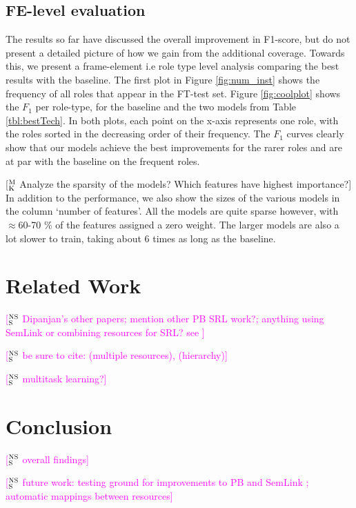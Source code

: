 \documentclass[11pt,a4paper]{article}
\newcommand{\ensuretext}[1]{#1}
\newcommand{\nssmarker}{\ensuretext{\textcolor{magenta}{\ensuremath{^{\textsc{NS}}_{\textsc{S}}}}}}
\newcommand{\mkmarker}{\ensuretext{\textcolor{mdgreen}{\ensuremath{^{\textsc{M}}_{\textsc{K}}}}}}
\newcommand{\arkcomment}[3]{\ensuretext{\textcolor{#3}{[#1 #2]}}}
\newcommand{\nss}[1]{\arkcomment{\nssmarker}{#1}{magenta}}
\newcommand{\mk}[1]{\arkcomment{\mkmarker}{#1}{mdgreen}}
\newcommand{\finalversion}[1]{}
\begin{document}
\subsection{FE-level evaluation}
The results so far have discussed the overall improvement in F1-score, but do not present a detailed picture of how we gain from the additional
coverage. Towards this, we present a frame-element i.e role type level analysis comparing the best results with the baseline.
The first plot in Figure \ref{fig:num_inst} shows the frequency of all roles that appear in the FT-test set.
Figure \ref{fig:coolplot} shows the $F_1$ per role-type, for the baseline and the two models from Table \ref{tbl:bestTech}.
In both plots, each point on the x-axis represents one role, with the roles sorted in the decreasing order of their frequency.
The $F_1$ curves clearly show that our models achieve the best improvements for the rarer roles and are at par with the baseline on the frequent roles.

\mk{Analyze the sparsity of the models? Which features have highest importance?}
In addition to the performance, we also show the sizes of the various models in the column `number of features'. All the models are quite sparse however,
with $\approx$60-70 \% of the features assigned a zero weight. The larger models are also a lot slower to train, taking about 6 times
as long as the baseline. 


\section{Related Work}

\nss{Dipanjan's other papers; mention other PB SRL work?; anything using SemLink or combining resources for SRL? see \citep[\S4]{bonial-13}}

\nss{be sure to cite: \citep{shi-05} (multiple resources), \citep{matsubayashi-09} (hierarchy)}

\nss{multitask learning?}

\section{Conclusion}

\nss{overall findings}

\nss{future work: testing ground for improvements to PB \citep{bonial-14} and SemLink \citep{bonial-13}; automatic mappings between resources}

\finalversion{\section*{Acknowledgments}

FUNDING}

\smaller


\setlength{\bibsep}{1pt}
{\fontsize{10}{12.25}\selectfont
}
\end{document}
